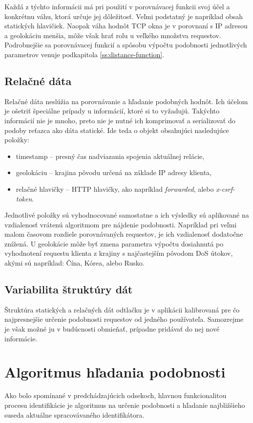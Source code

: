 \documentclass[
  printed, %
  table,   %
  lof,     %
  nolot,   %
  nocover
]{fithesis3}
\begin{document}
Každá z týchto informácii má pri použití v porovnávacej funkcii svoj účel a
konkrétnu váhu, ktorá určuje jej dôležitosť. Veľmi podstatný je napríklad obsah statických hlavičiek. Naopak
váha hodnôt TCP okna je v porovnaní s IP adresou a geolokáciu menšia, môže však
hrať rolu u veľkého množstva requestov. Podrobnejšie sa porovnávacej funkcií a
spôsobu výpočtu podobnosti jednotlivých parametrov venuje podkapitola \ref{ss:distance-function}.

\subsection{Relačné dáta}
Relačné dáta neslúžia na porovnávanie a hľadanie podobných hodnôt. Ich účelom
je ošetriť špeciálne prípady u informácií, ktoré si to vyžadujú. Takýchto
informácií nie je mnoho, preto nie je nutné ich komprimovať a serializovať do podoby reťazca ako
dáta statické.
Ide teda o objekt obsahujúci nasledujúce položky:
\begin{itemize}
    \item timestamp -- presný čas nadviazania spojenia aktuálnej relácie,
    \item geolokáciu -- krajina pôvodu určená na základe IP adresy klienta,
    \item relačné hlavičky -- HTTP hlavičky, ako napríklad
    \textit{forwarded}, alebo \textit{x-csrf-token}. 
\end{itemize}

Jednotlivé položky sú vyhodnocované samostatne a ich výsledky sú aplikované na
vzdialenosť vrátenú algoritmom pre nájdenie podobnosti. Napríklad pri veľmi
malom časovom rozdiele porovnávaných requestov, je ich vzdialenosť dodatočne
znížená. U geolokácie môže byť zmena parametra výpočtu dosiahnutá po vyhodnotení requestu
klienta z krajiny s najčastejším pôvodom DoS útokov, akými sú napríklad: Čína,
Kórea, alebo Rusko.

\subsection{Variabilita štruktúry dát}
Štruktúra statických a relačných dát odtlačku je v aplikácii kalibrovaná
pre čo najpresnejšie určenie podobnosti requestov od jedného používateľa.
Samozrejme je však možné ju v budúcnosti obmieňať, prípadne pridávať do nej
nové informácie.

\section{Algoritmus hľadania podobnosti}
\label{s:similarity-search}
Ako bolo spomínané v predchádzajúcich odsekoch, hlavnou funkcionalitou procesu identifikácie je
algoritmus na určenie podobnosti a hľadanie najbližšieho suseda aktuálne
spracovávaného identifikátora. 
\end{document}
